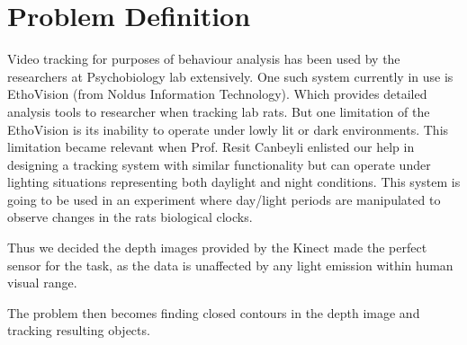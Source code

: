 \chapter{Problem Definition}
Video tracking for purposes of behaviour analysis has been used by the researchers at Psychobiology lab extensively. One such system currently in use is EthoVision (from Noldus Information Technology). Which provides detailed analysis tools to researcher when tracking lab rats. But one limitation of the EthoVision is its inability to operate under lowly lit or dark environments. This limitation became relevant when Prof. Resit Canbeyli enlisted our help in designing a tracking system with similar functionality but can operate under lighting situations representing both daylight and night conditions. This system is going to be used in an experiment where day/light periods are manipulated to observe changes in the rats biological clocks.

Thus we decided the depth images provided by the Kinect made the perfect sensor for the task, as the data is unaffected by any light emission within human visual range.

The problem then becomes finding closed contours in the depth image and tracking resulting objects.
